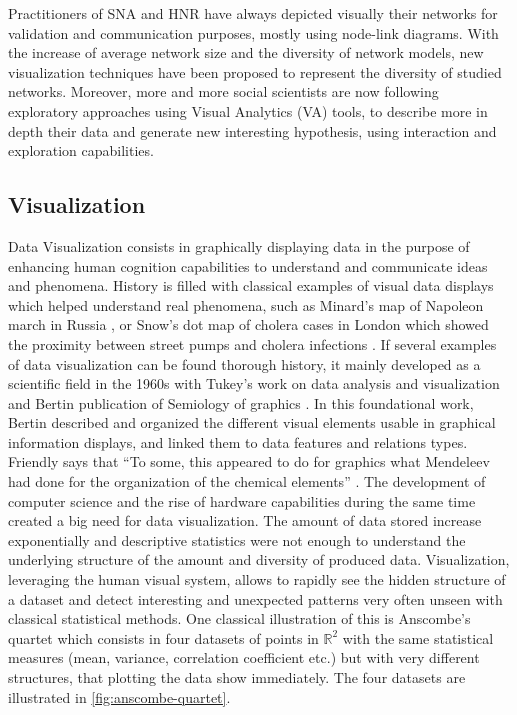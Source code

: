 Practitioners of SNA and HNR have always depicted visually their networks for validation and communication purposes, mostly using node-link diagrams.
With the increase of average network size and the diversity of network models, new visualization techniques have been proposed to represent the diversity of studied networks.
Moreover, more and more social scientists are now following exploratory approaches using Visual Analytics (VA) tools, to describe more in depth their data and generate new interesting hypothesis, using interaction and exploration capabilities.

\subsection{Visualization}

Data Visualization consists in graphically displaying data in the purpose of enhancing human cognition capabilities to understand and communicate ideas and phenomena.
History is filled with classical examples of visual data displays which helped understand real phenomena, such as Minard's map of Napoleon march in Russia \cite{friendlyVisionsReVisionsCharles2002}, or Snow's dot map of cholera cases in London which showed the proximity between street pumps and cholera infections \cite{snowModeCommunicationCholera1856}.
If several examples of data visualization can be found thorough history, it mainly developed as a scientific field in the 1960s with Tukey's work on data analysis and visualization \cite{tukeyFutureDataAnalysis1962} and Bertin publication of Semiology of graphics \cite{bertin1967}.
In this foundational work, Bertin described and organized the different visual elements usable in graphical information displays, and linked them to data features and relations types.
Friendly says that ``To some, this appeared to do for graphics what Mendeleev had done for the organization of the chemical elements'' \cite{friendlyBriefHistoryData2008}.
The development of computer science and the rise of hardware capabilities during the same time created a big need for data visualization.
The amount of data stored increase exponentially and descriptive statistics were not enough to understand the underlying structure of the amount and diversity of produced data.
Visualization, leveraging the human visual system, allows to rapidly see the hidden structure of a dataset and detect interesting and unexpected patterns very often unseen with classical statistical methods.
One classical illustration of this is Anscombe's quartet \cite{anscombeGraphsStatisticalAnalysis1973} which consists in four datasets of points in $\mathbb{R} ^{2}$ with the same statistical measures (mean, variance, correlation coefficient etc.) but with very different structures, that plotting the data show immediately.
The four datasets are illustrated in \autoref{fig:anscombe-quartet}.



